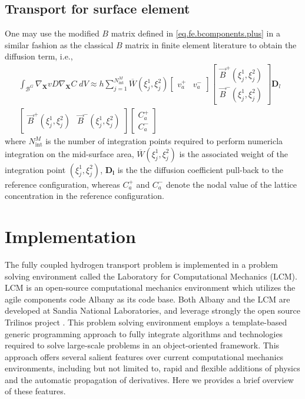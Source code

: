 \documentclass[10pt]{elsarticle}
\newcommand{\mbs}[1]{\boldsymbol{#1}}
\def\bs{{\mbs{s}}} \def\bt{{\mbs{t}}} \def\bu{{\mbs{u}}}
\def\bs{\boldsymbol}
\newcommand{\tensor}[1]{\ensuremath{\boldsymbol{#1}}}
\begin{document}
\subsection{Transport for surface element}
One may use the modified $B$ matrix defined in
\eqref{eq.fe.bcomponents.plus} in a similar fashion as the classical 
$B$ matrix in finite element literature to obtain the diffusion term, i.e., 
\begin{align}
\label{eq:DiscreteDiffusion} 
 \int_{\mathcal{B}^{G}} \nabla_{\bs{X}} v D \nabla_{\bs{X}} C \; dV
  \approx   
h \sum_{j=1}^{N^{M}_{\text{int}}}  \overline{W}(\xi_{j}^{1}, \xi_{j}^{2})
\begin{bmatrix} v_{a}^{+} &  v_{a}^{-} \end{bmatrix} 
\begin{bmatrix} \vec{B}^{+}(\xi_{j}^{1}, \xi_{j}^{2}) \\ \vec{B}^{-}(\xi_{j}^{1}, \xi_{j}^{2}) \end{bmatrix}
\tensor{D}_{l} \nonumber \\
\begin{bmatrix} \vec{B}^{+}(\xi_{j}^{1}, \xi_{j}^{2}) & \vec{B}^{-}(\xi_{j}^{1}, \xi_{j}^{2}) \end{bmatrix} 
\begin{bmatrix} C_{a}^{+} \\ C_{a}^{-} \end{bmatrix} &
\end{align}
where $N^{M}_{\text{int}}$ is the number of integration points required to 
perform numericla integration on the mid-surface area, 
$\overline{W}(\xi^{1}_{j}, \xi_{j}^{2})$ is the associated weight
of the integration point $(\xi^{1}_{j}, \xi_{j}^{2})$, $\tensor{D_{l}}$ is the 
the diffusion coefficient pull-back to the reference configuration, whereas 
$C_{a}^{+}$ and $C_{a}^{-}$ denote the nodal value of the lattice
concentration in the reference configuration.  


\section{Implementation}
The fully coupled hydrogen transport  problem is implemented
in a problem solving environment called the Laboratory for Computational Mechanics
(LCM). LCM is an open-source computational mechanics environment
which utilizes the agile components code Albany \citep{Salinger:2010, Salinger:2013}
as its code base. Both Albany and the LCM are developed at Sandia
National Laboratories, and leverage strongly the open source
Trilinos project \citep{Heroux:2005}. This problem solving
environment employs a template-based generic programming approach
to fully integrate algorithms and technologies required to solve
large-scale problems in an object-oriented framework. This
approach offers several salient features over current
computational mechanics environments, including but not limited
to, rapid and flexible additions of physics and the automatic
propagation of derivatives. Here we provides a brief overview
of these features.
\end{document}
